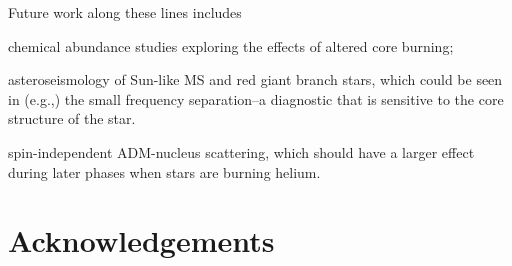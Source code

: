 \documentclass[useAMS,usenatbib]{mnras}
\begin{document}
Future work along these lines includes 
\begin{inparaenum}[1)]
\item chemical abundance studies exploring the effects of altered core burning;
\item asteroseismology of Sun-like MS and red giant branch stars, which could be seen in (e.g.,) the small frequency separation--a diagnostic that is sensitive to the core structure of the star.
\item spin-independent ADM-nucleus scattering, which should have a larger effect during later phases when stars are burning helium.
\end{inparaenum}





\section*{Acknowledgements}










\appendix








\bsp	%

\label{lastpage}
\end{document}
